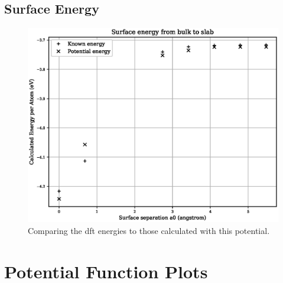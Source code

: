 \clearpage
\subsection{Surface Energy}

\begin{figure}[htb]
\centering
\includegraphics[width=.65\linewidth]{chapters/results_potential_fitting/fepd_potential/fe_surface_energy.eps}  
\caption{Comparing the \acrshort{dft} energies to those calculated with this potential.}
\label{fig:fepd-fefcc-rose}
\end{figure}





\clearpage
\FloatBarrier
\section{Potential Function Plots}


